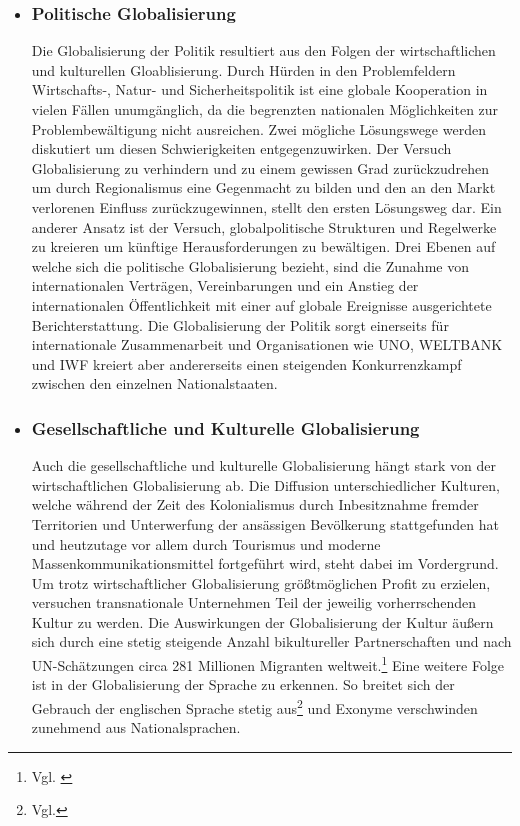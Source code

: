 \documentclass[12pt]{article}
\begin{document}
\begin{itemize}
    \item \subsubsection{Politische Globalisierung}
    \begin{sloppypar}
    Die Globalisierung der Politik resultiert aus den Folgen der wirtschaftlichen und kulturellen Gloablisierung. Durch Hürden in den Problemfeldern Wirtschafts-, Natur- und Sicherheitspolitik ist eine globale Kooperation in vielen Fällen unumgänglich, da die begrenzten nationalen Möglichkeiten zur Problembewältigung nicht ausreichen. Zwei mögliche Lösungswege werden diskutiert um diesen Schwierigkeiten entgegenzuwirken. Der Versuch Globalisierung zu verhindern und zu einem gewissen Grad zurückzudrehen um durch Regionalismus eine Gegenmacht zu bilden und den an den Markt verlorenen Einfluss zurückzugewinnen, stellt den ersten Lösungsweg dar. Ein anderer Ansatz ist der Versuch, globalpolitische Strukturen und Regelwerke zu kreieren um künftige Herausforderungen zu bewältigen. Drei Ebenen auf welche sich die politische Globalisierung bezieht, sind die Zunahme von internationalen Verträgen, Vereinbarungen und ein Anstieg der internationalen Öffentlichkeit mit einer auf globale Ereignisse ausgerichtete Berichterstattung. Die Globalisierung der Politik sorgt einerseits für internationale Zusammenarbeit und Organisationen wie UNO, WELTBANK und IWF kreiert aber andererseits einen steigenden Konkurrenzkampf zwischen den einzelnen Nationalstaaten.
    \end{sloppypar}
    \item \subsubsection{Gesellschaftliche und Kulturelle Globalisierung}
    \begin{sloppypar}
    Auch die gesellschaftliche und kulturelle Globalisierung hängt stark von der wirtschaftlichen Globalisierung ab. Die Diffusion unterschiedlicher Kulturen, welche während der Zeit des Kolonialismus durch Inbesitznahme fremder Territorien und Unterwerfung der ansässigen Bevölkerung stattgefunden hat und heutzutage vor allem durch Tourismus und moderne Massenkommunikationsmittel fortgeführt wird, steht dabei im Vordergrund. Um trotz wirtschaftlicher Globalisierung größtmöglichen Profit zu erzielen, versuchen transnationale Unternehmen Teil der jeweilig vorherrschenden Kultur zu werden. Die Auswirkungen der Globalisierung der Kultur äußern sich durch eine stetig steigende Anzahl bikultureller Partnerschaften und nach UN-Schätzungen circa 281 Millionen Migranten weltweit.\footnote{Vgl. \cite{WMR2020}} Eine weitere Folge ist in der Globalisierung der Sprache zu erkennen. So breitet sich der Gebrauch der englischen Sprache stetig aus\footnote{Vgl.\cite{Sprache2016}} und Exonyme verschwinden zunehmend aus Nationalsprachen.

\end{sloppypar}
\end{itemize}
\end{document}
